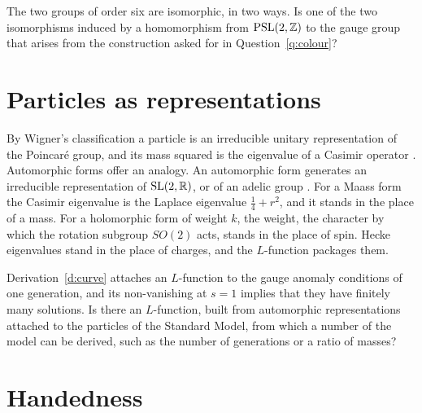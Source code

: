\documentclass[11pt]{article}
\begin{document}
\begin{question}\label{q:six}
The two groups of order six are isomorphic, in two ways.
Is one of the two isomorphisms induced by a homomorphism from $\mathrm{PSL}(2,\mathbb{Z})$ to the gauge group that arises from the construction asked for in Question~\ref{q:colour}?
\end{question}

\section{Particles as representations}

By Wigner's classification a particle is an irreducible unitary representation of the Poincar\'e group, and its mass squared is the eigenvalue of a Casimir operator \cite{Wigner}.
Automorphic forms offer an analogy.
An automorphic form generates an irreducible representation of $\mathrm{SL}(2,\mathbb{R})$, or of an adelic group \cite{Bump}.
For a Maass form the Casimir eigenvalue is the Laplace eigenvalue $\frac14+r^2$, and it stands in the place of a mass.
For a holomorphic form of weight $k$, the weight, the character by which the rotation subgroup $SO(2)$ acts, stands in the place of spin.
Hecke eigenvalues stand in the place of charges, and the $L$-function packages them.

\begin{question}\label{q:rep}
Derivation~\ref{d:curve} attaches an $L$-function to the gauge anomaly conditions of one generation, and its non-vanishing at $s=1$ implies that they have finitely many solutions.
Is there an $L$-function, built from automorphic representations attached to the particles of the Standard Model, from which a number of the model can be derived, such as the number of generations or a ratio of masses?
\end{question}

\section{Handedness}
\end{document}

